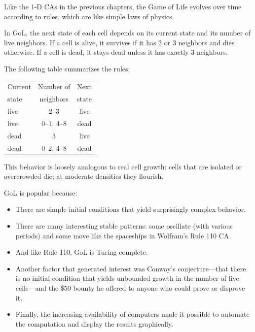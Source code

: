 \documentclass[12pt]{book}
\theoremstyle{exercise}
\begin{document}
Like the 1-D CAs in the previous chapters, the Game of Life evolves
over time according to rules, which are like simple laws of physics.

In GoL, the next state of each cell depends on its current state and
its number of live neighbors.  If a cell is alive, it survives if it
has 2 or 3 neighbors and dies otherwise.  If a cell is
dead, it stays dead unless it has exactly 3 neighbors.

The following table summarizes the rules:

\begin{tabular}{|l|c|c|}
\hline
Current    &    Number of     & Next \\
state      &    neighbors     & state \\
\hline
live       &  2--3          & live         \\
live       &  0--1, 4--8    & dead         \\
dead       &  3             & live         \\
dead       &  0--2, 4--8    & dead         \\
\hline
\end{tabular}

This behavior is loosely analogous to real cell growth: cells
that are isolated or overcrowded die; at moderate densities they
flourish.

GoL is popular because:

\begin{itemize}

\item There are simple initial conditions that yield
surprisingly complex behavior.


\item There are many interesting stable patterns: some
oscillate (with various periods) and some move like the
spaceships in Wolfram's Rule 110 CA.

\item And like Rule 110, GoL is Turing complete.


\item Another factor that generated interest was Conway's
conjecture---that there is
no initial condition that yields unbounded growth in the number
of live cells---and the \$50 bounty he offered to anyone who could prove
or disprove it.


\item Finally, the increasing availability of computers made it
  possible to automate the computation and display the results
  graphically.

\end{itemize}
\end{document}
